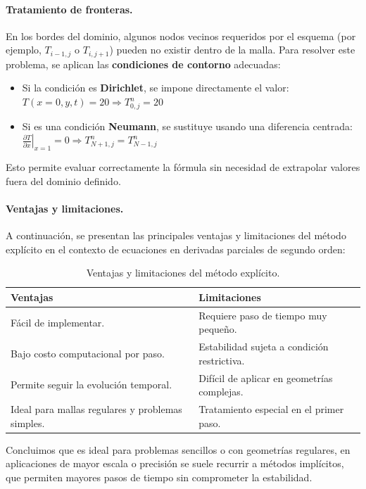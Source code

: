 \documentclass{article}
\begin{document}
\paragraph{Tratamiento de fronteras.} En los bordes del dominio, algunos nodos vecinos requeridos por el esquema (por ejemplo, $T_{i-1,j}$ o $T_{i,j+1}$) pueden no existir dentro de la malla. Para resolver este problema, se aplican las \textbf{condiciones de contorno} adecuadas:

\begin{itemize}
    \item Si la condición es \textbf{Dirichlet}, se impone directamente el valor: $T(x=0, y, t) = 20 \Rightarrow T_{0,j}^n = 20$
    \item Si es una condición \textbf{Neumann}, se sustituye usando una diferencia centrada:
    $\left. \frac{\partial T}{\partial x} \right|_{x=1} = 0 \Rightarrow T_{N+1,j}^n = T_{N-1,j}^n$
\end{itemize}

\noindent Esto permite evaluar correctamente la fórmula sin necesidad de extrapolar valores fuera del dominio definido.

\paragraph{Ventajas y limitaciones.} A continuación, se presentan las principales ventajas y limitaciones del método explícito en el contexto de ecuaciones en derivadas parciales de segundo orden:

\begin{table}[H]
\centering
\begin{tabular}{|p{6.5cm}|p{6.5cm}|}
\hline
\textbf{Ventajas} & \textbf{Limitaciones} \\
\hline
Fácil de implementar. & Requiere paso de tiempo muy pequeño. \\
\hline
Bajo costo computacional por paso. & Estabilidad sujeta a condición restrictiva. \\
\hline
Permite seguir la evolución temporal. & Difícil de aplicar en geometrías complejas. \\
\hline
Ideal para mallas regulares y problemas simples. & Tratamiento especial en el primer paso. \\
\hline
\end{tabular}
\caption{Ventajas y limitaciones del método explícito.}
\end{table}

Concluimos que es ideal para problemas sencillos o con geometrías regulares, en aplicaciones de mayor escala o precisión se suele recurrir a métodos implícitos, que permiten mayores pasos de tiempo sin comprometer la estabilidad.
\end{document}
